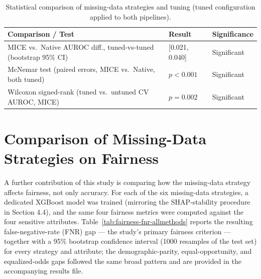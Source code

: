 \documentclass[12pt,a4paper]{report}
\begin{document}
\begin{table}[H]
\centering
\caption{Statistical comparison of missing-data strategies and tuning (tuned configuration applied to both pipelines).}
\label{tab:stat-tests}
\small
\begin{tabular}{lll}
\toprule
Comparison / Test & Result & Significance \\
\midrule
MICE vs.\ Native AUROC diff., tuned-vs-tuned (bootstrap 95\% CI) & [0.021, 0.040] & Significant \\
McNemar test (paired errors, MICE vs.\ Native, both tuned) & $p < 0.001$ & Significant \\
Wilcoxon signed-rank (tuned vs.\ untuned CV AUROC, MICE) & $p = 0.002$ & Significant \\
\bottomrule
\end{tabular}
\end{table}


\section{Comparison of Missing-Data Strategies on Fairness}
A further contribution of this study is comparing how the missing-data strategy affects fairness, not only accuracy. For each of the six missing-data strategies, a dedicated XGBoost model was trained (mirroring the SHAP-stability procedure in Section 4.4), and the same four fairness metrics were computed against the four sensitive attributes. Table~\ref{tab:fairness-fnr-allmethods} reports the resulting false-negative-rate (FNR) gap --- the study's primary fairness criterion --- together with a 95\% bootstrap confidence interval (1000 resamples of the test set) for every strategy and attribute; the demographic-parity, equal-opportunity, and equalized-odds gaps followed the same broad pattern and are provided in the accompanying results file.
\end{document}
